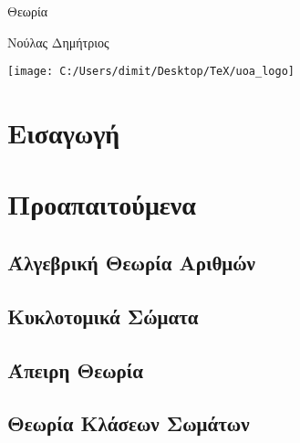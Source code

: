 \documentclass[oneside,a4paper]{article}
\begin{document}
	
	
	
	
	\begin{framed}	
		\begin{center}
			\huge Θεωρία 
		\end{center}
		\vspace{0.3truecm}
		\begin{center}
            Νούλας Δημήτριος\\
\end{center}
		\vspace{0.3truecm}
	\end{framed}
	\vspace*{\fill}
	\begin{center}
	\texttt{[image: C:/Users/dimit/Desktop/TeX/uoa\_logo]}
	\end{center}
\vspace{1cm}
\pagebreak

\tableofcontents
\pagebreak

\section{Εισαγωγή}

\section{Προαπαιτούμενα}

\subsection{Άλγεβρική Θεωρία Αριθμών}
\subsection{Κυκλοτομικά Σώματα}
\subsection{Άπειρη Θεωρία }
\subsection{Θεωρία Κλάσεων Σωμάτων}
\end{document}
